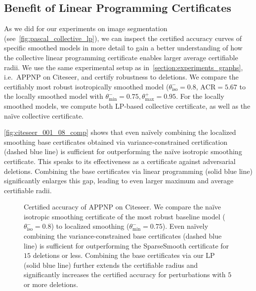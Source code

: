 \subsection{Benefit of Linear Programming Certificates}
As we did for our experiments on image segmentation (see~\autoref{fig:pascal_collective_lp}), we can inspect the certified accuracy curves of specific smoothed models in more detail to gain a better understanding of how the collective linear programming certificate enables larger average certifiable radii.
We use the same experimental setup as in~\autoref{section:experiments_graphs}, i.e.~APPNP on Citeseer, and certify robustness to deletions.
We compare the certifiably most robust isotropically smoothed model ($\theta^{-}_\mathrm{iso} = 0.8$, $\mathrm{ACR}=5.67$ to the locally smoothed model with $\theta^{-}_\mathrm{min} = 0.75, \theta^{+}_\mathrm{max} = 0.95$.
For the locally smoothed models, we compute both LP-based collective certificate, as well as the na\"ive collective certificate.

\autoref{fig:citeseer_001_08_comp} shows that even na\"ively combining the localized smoothing base certificates obtained via variance-constrained certification (dashed blue line) is sufficient for outperforming the na\"ive isotropic smoothing certificate.
This speaks to its effectiveness as a certificate against adversarial deletions.
Combining the base certificates via linear programming (solid blue line) significantly enlarges this gap, leading to even larger maximum and average certifiable radii.


\begin{figure}[t!]
    \vspace{0cm}
    \centering
        
        \caption{
        Certified accuracy of APPNP on Citeseer. We compare the na\"ive isotropic smoothing certificate of the most robust baseline model ($\theta^{-}_\mathrm{iso} = 0.8$) to localized smoothing   
    ($\theta^{-}_\mathrm{min} = 0.75$).
    Even na\"ively combining the variance-constrained base certificates (dashed blue line) is sufficient for outperforming the SparseSmooth certificate for $15$ deletions or less.
    Combining the base certificates via our LP (solid blue line) further extends the certifiable radius and significantly increases the certified accuracy for perturbations with $5$ or more deletions.
        }
        \label{fig:citeseer_001_08_comp}
    \vspace{17cm}
\end{figure}

